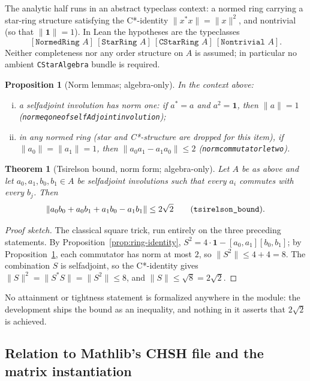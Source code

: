 \documentclass[11pt]{article}
\renewcommand{\_}{\textunderscore\allowbreak}
\newtheorem{theorem}{Theorem}
\newtheorem{proposition}{Proposition}
\theoremstyle{remark}
\newcommand{\norm}[1]{\lVert #1\rVert}
\newcommand{\one}{\mathbf 1}
\begin{document}
The analytic half runs in an abstract typeclass context: a normed ring carrying a star-ring structure satisfying the C*-identity $\norm{x^{*}x} = \norm{x}^2$, and nontrivial (so that $\norm{\one} = 1$). In Lean the hypotheses are the typeclasses
\[
[\texttt{NormedRing } A]\ [\texttt{StarRing } A]\ [\texttt{CStarRing } A]\ [\texttt{Nontrivial } A].
\]
Neither completeness nor any order structure on $A$ is assumed; in particular no ambient \texttt{CStarAlgebra} bundle is required.

\begin{proposition}[Norm lemmas; algebra-only]
\label{prop:norm-lemmas}
In the context above:
\begin{enumerate}[(i)]
\item a selfadjoint involution has norm one: if $a^{*} = a$ and $a^2 = \one$, then $\norm{a} = 1$ (\texttt{norm\_eq\_one\_of\_selfAdjoint\_involution});
\item in any normed ring (star and C*-structure are dropped for this item), if $\norm{a_0} = \norm{a_1} = 1$, then $\norm{a_0 a_1 - a_1 a_0} \le 2$ (\texttt{norm\_commutator\_le\_two}).
\end{enumerate}
\end{proposition}

\begin{theorem}[Tsirelson bound, norm form; algebra-only]
\label{thm:tsirelson}
Let $A$ be as above and let $a_0, a_1, b_0, b_1 \in A$ be selfadjoint involutions such that every $a_i$ commutes with every $b_j$. Then
\[
\norm{a_0 b_0 + a_0 b_1 + a_1 b_0 - a_1 b_1} \le 2\sqrt{2}
\qquad (\texttt{tsirelson\_bound}).
\]
\end{theorem}

\begin{proof}[Proof sketch]
The classical square trick, run entirely on the three preceding statements. By Proposition~\ref{prop:ring-identity}, $S^2 = 4\cdot\one - [a_0,a_1][b_0,b_1]$; by Proposition~\ref{prop:norm-lemmas}, each commutator has norm at most $2$, so $\norm{S^2} \le 4 + 4 = 8$. The combination $S$ is selfadjoint, so the C*-identity gives $\norm{S}^2 = \norm{S^{*}S} = \norm{S^2} \le 8$, and $\norm{S} \le \sqrt 8 = 2\sqrt 2$.
\end{proof}

No attainment or tightness statement is formalized anywhere in the module: the development ships the bound as an inequality, and nothing in it asserts that $2\sqrt 2$ is achieved.

\subsection{Relation to Mathlib's CHSH file and the matrix instantiation}
\end{document}
